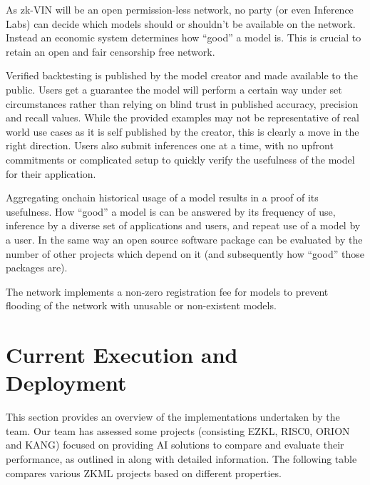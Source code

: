 \documentclass[conference]{IEEEtran}
\begin{document}
As zk-VIN will be an open permission-less network, no party (or even Inference Labs) can decide which models should or shouldn’t be available on the network. Instead an economic system determines how “good” a model is. This is crucial to retain an open and fair censorship free network.

Verified backtesting is published by the model creator and made available to the public. Users get a guarantee the model will perform a certain way under set circumstances rather than relying on blind trust in published accuracy, precision and recall values. While the provided examples may not be representative of real world use cases as it is self published by the creator, this is clearly a move in the right direction. Users also submit inferences one at a time, with no upfront commitments or complicated setup to quickly verify the usefulness of the model for their application.

Aggregating onchain historical usage of a model results in a proof of its usefulness. How “good” a model is can be answered by its frequency of use, inference by a diverse set of applications and users, and repeat use of a model by a user. In the same way an open source software package can be evaluated by the number of other projects which depend on it (and subsequently how “good” those packages are).

The network implements a non-zero registration fee for models to prevent flooding of the network with unusable or non-existent models.


\section{Current Execution and Deployment}
This section provides an overview of the implementations undertaken by the team. Our team has assessed some projects (consisting EZKL, RISC0, ORION and KANG) focused on providing AI solutions to compare and evaluate their performance, as outlined in  along with detailed information. The following table compares various ZKML projects based on different properties.
\end{document}
